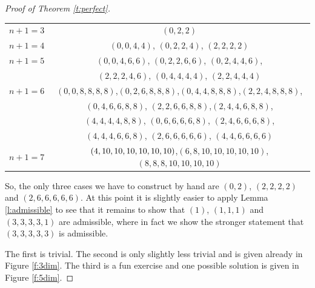\documentclass[10pt,a4paper]{amsart}
\newtheorem{comment}{Comment}
\begin{document}
\begin{proof}[Proof of Theorem \ref{t:perfect}]
\begin{center}
\begin{tabular}{ |c|c| } 
 \hline
 $n+1=3$ & \color{blue}$(0,2,2)$\color{black}  \\ 
 $n+1=4$ &  \color{blue}$(0,0,4,4)$\color{black}, \color{blue}$(0,2,2,4)$\color{black}, \color{red}$(2,2,2,2)$  \\ 
$n+1=5$ &  \color{blue}$(0,0,4,6,6)$\color{black}, \color{blue}$(0,2,2,6,6)$\color{black}, \color{blue}$(0,2,4,4,6)$\color{black},\\
& \color{blue}$(2,2,2,4,6)$\color{black}, \color{blue}$(0,4,4,4,4)$\color{black}, \color{blue}$(2,2,4,4,4)$ \color{black} \\ 
$n+1=6$ &  \color{blue}$(0,0,8,8,8,8)$\color{black},\color{blue}$(0,2,6,8,8,8)$\color{black},\color{blue}$(0,4,4,8,8,8)$\color{black},\color{blue}$(2,2,4,8,8,8)$\color{black}, \\
&\color{blue}$(0,4,6,6,8,8)$\color{black}, \color{blue}$(2,2,6,6,8,8)$\color{black},\color{blue}$(2,4,4,6,8,8)$\color{black},\\
& \color{blue}$(4,4,4,4,8,8)$\color{black},
\color{blue}$(0,6,6,6,6,8)$\color{black}, \color{blue}$(2,4,6,6,6,8)$, \\
& \color{blue}$(4,4,4,6,6,8)$\color{black},
\color{red}$(2,6,6,6,6,6)$\color{black}, \color{blue}$(4,4,6,6,6,6)$\color{black}\\ 
 $n+1=7$ &  \color{blue}$(4,10,10,10,10,10,10)\color{black}$,\color{blue}$(6,8,10,10,10,10,10)$\color{black},\color{blue}$(8,8,8,10,10,10,10)$\color{black}  \\ 
 \hline
\end{tabular}
\end{center}
So, the only three cases we have to construct by hand are $(0,2)$, $(2,2,2,2)$ and $(2,6,6,6,6,6)$. At this point it is slightly easier to apply Lemma \ref{l:admissible} to see that it remains to show that $(1)$, $(1,1,1)$ and $(3,3,3,3,1)$ are admissible, where in fact we show the stronger statement that $(3,3,3,3,3)$ is admissible.

The first is trivial. The second is only slightly less trivial and is given already in Figure \ref{f:3dim}. The third is a fun exercise and one possible solution is given in Figure \ref{f:5dim}.

\end{proof}
\end{document}
